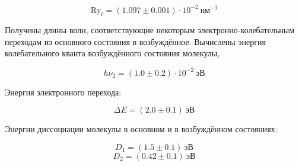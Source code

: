 \documentclass[a5paper, 10pt, twoside]{article} %
\begin{document}
\[ \text{Ry}_t=(1.097 \pm 0.001)\cdot 10^{-2} \ \text{нм}^{-1} \]


Получены длины волн, соответствующие некоторым электронно-колебательным
переходам из основного состояния в возбуждённое. Вычислены энергия
колебательного кванта возбуждённого состояния молекулы,

\[	h\nu_2=(1.0\pm 0.2)\cdot 10^{-2} \ \text{эВ} \]

Энергия электронного перехода:

\[ \Delta E=(2.0\pm 0.1) \ \text{эВ} \]

Энергии диссоциации молекулы в основном и в возбуждённом состояниях:

\[ D_1=(1.5\pm 0.1)\  \text{эВ} \]
\[ D_2=(0.42\pm 0.1) \ \text{эВ} \]
\end{document}
